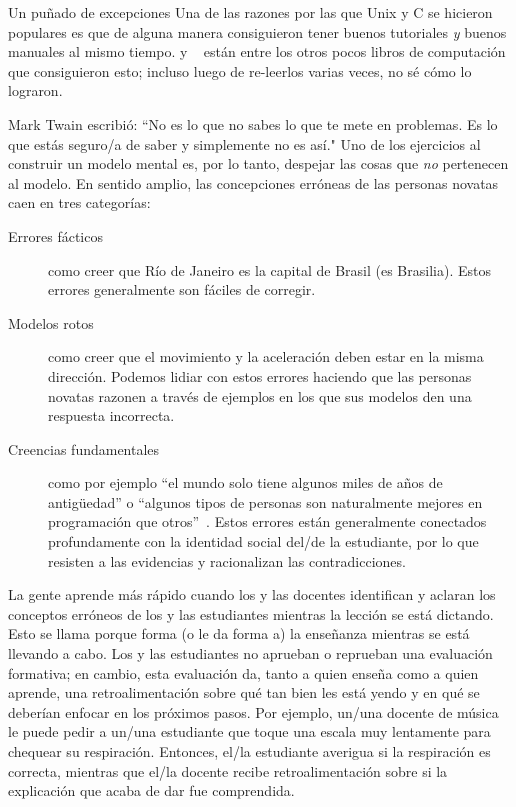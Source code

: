 \begin{aside}{Un puñado de excepciones}
  Una de las razones por las que Unix y C se hicieron populares es que 
  \cite{Kern1978,Kern1983,Kern1988}
  de alguna manera consiguieron tener buenos tutoriales \emph{y} buenos manuales al mismo tiempo.
  \cite{Fehi2008} y ~\cite{Ray2014} están entre los otros pocos libros de computación que consiguieron esto; incluso luego de re-leerlos varias veces, no sé cómo lo lograron.
\end{aside}


Mark Twain escribió: 
``No es lo que no sabes lo que te mete en problemas.
Es lo que estás seguro/a de saber y simplemente no es así."
Uno de los ejercicios al construir un modelo mental es, por lo tanto,
despejar las cosas que \emph{no} pertenecen al modelo.
En sentido amplio,
las concepciones erróneas de las personas novatas caen en tres categorías:

\begin{description}

\item[Errores fácticos]
  como creer que Río de Janeiro es la capital de Brasil (es Brasilia).
Estos errores generalmente son fáciles de corregir.

\item[Modelos rotos]
  como creer que el movimiento y la aceleración deben estar en la misma dirección.
Podemos lidiar con estos errores haciendo que las personas novatas razonen a través de ejemplos
en los que sus modelos den una respuesta incorrecta.

\item[Creencias fundamentales]
  como por ejemplo ``el mundo solo tiene algunos miles de años de antigüedad''
  o ``algunos tipos de personas son naturalmente mejores en programación que otros''~\cite{Guzd2015b,Pati2016}.
  Estos errores están generalmente conectados profundamente con la identidad social del/de la estudiante, 
por lo que resisten a las evidencias y racionalizan las contradicciones.

\end{description}

La gente aprende más rápido cuando los y las docentes identifican y aclaran los conceptos erróneos de los y las estudiantes mientras la lección se está dictando.
Esto se llama 
porque forma (o le da forma a) la enseñanza mientras se está llevando a cabo.
Los y las estudiantes no aprueban o reprueban una evaluación formativa;
en cambio,
esta evaluación da, tanto a quien enseña como a quien aprende, una retroalimentación sobre qué tan bien les está yendo y en qué se deberían enfocar en los próximos pasos.
Por ejemplo,
un/una docente de música le puede pedir a un/una estudiante que toque una escala muy lentamente para chequear su respiración.
Entonces, el/la estudiante averigua si la respiración es correcta, mientras que el/la docente recibe retroalimentación sobre si la explicación que acaba de dar fue comprendida.

